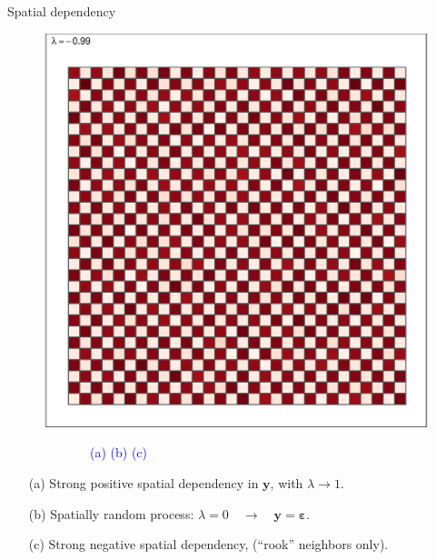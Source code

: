 \documentclass{beamer}
\begin{document}
\begin{frame}{Spatial dependency}
\begin{figure}[htbp]
  \includegraphics[trim=1cm 0cm 1cm 0cm, clip=true]{IMG/Plot4_negative.eps}
\end{figure}
\vspace{-0.5cm}
\textcolor{blue}{~~~~~~~~~~~~~(a) \hfill (b) \hfill (c)~~~~~~~~~~~~~}
\begin{itemize}
    \item[(a)] Strong positive spatial dependency in $\bm{y}$, with $\lambda \rightarrow 1$.
    \item[(b)] Spatially random process: $\lambda = 0 \quad \rightarrow \quad \bm{y} =  \bm{\varepsilon}$.
    \item[(c)] Strong negative spatial dependency, (``rook'' neighbors only).
\end{itemize}
\end{frame}
\end{document}
